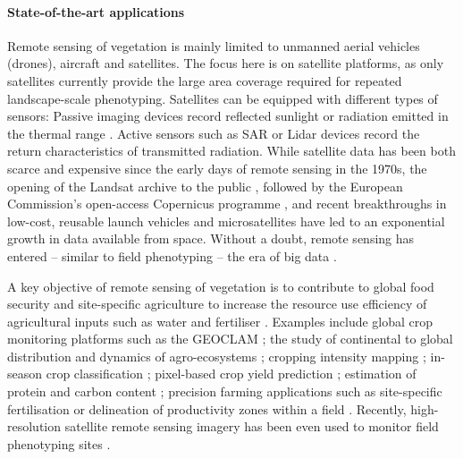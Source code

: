 \paragraph{State-of-the-art applications}
Remote sensing of vegetation is mainly limited to unmanned aerial vehicles (drones), aircraft and satellites.  The focus here is on satellite platforms, as only satellites currently provide the large area coverage required for repeated landscape-scale phenotyping. Satellites can be equipped with different types of sensors: Passive imaging devices record reflected sunlight or radiation emitted in the thermal range \citep{khanal_overview_2017}. Active sensors such as \gls{SAR} \citep{steele-dunne_radar_2017} or \gls{Lidar} devices \citep{dubayah_gedi_2022} record the return characteristics of transmitted radiation. While satellite data has been both scarce and expensive since the early days of remote sensing in the 1970s, the opening of the Landsat archive to the public \citep{zhu_benefits_2019}, followed by the European Commission's open-access Copernicus programme \citep{harris_open_2015}, and recent breakthroughs in low-cost, reusable launch vehicles \citep{reddy_spacex_2018} and microsatellites \citep{pelton_key_2019} have led to an exponential growth in data available from space. Without a doubt, remote sensing has entered -- similar to field phenotyping -- the era of big data \citep{sudmanns_big_2020}.

A key objective of remote sensing of vegetation is to contribute to global food security and site-specific agriculture to increase the resource use efficiency of agricultural inputs such as water and fertiliser \citep{bach_sustainable_2018}. Examples include global crop monitoring platforms such as the \gls{GEOCLAM} \citep{becker-reshef_strengthening_2020}; the study of continental to global distribution and dynamics of agro-ecosystems \citep{bolton_continental-scale_2020, dandrimont_detecting_2020, winkler_global_2021, moon_multiscale_2021}; cropping intensity mapping \citep{liu_mapping_2020}; in-season crop classification \citep{ruswurm_end--end_2023}; pixel-based crop yield prediction \citep{perich_pixel-based_2023}; estimation of protein and carbon content \cite{feret_prospect-pro_2021, longmire_estimation_2023}; precision farming applications such as site-specific fertilisation \citep{argento_site-specific_2021} or delineation of productivity zones within a field \citep{georgi_automatic_2018}. Recently, high-resolution satellite remote sensing imagery has been even used to monitor field phenotyping sites \citep{pinto_satellite_2023}.

